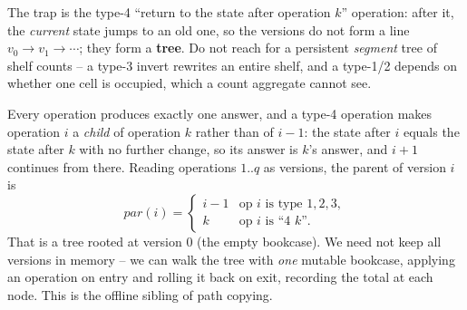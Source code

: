 \begin{attemptgate}
The trap is the type-4 ``return to the state after operation \(k\)'' operation: after it, the \emph{current} state jumps to an old one, so the versions do not form a line \(v_0\!\to\!v_1\!\to\!\cdots\); they form a \textbf{tree}.  Do not reach for a persistent \emph{segment} tree of shelf counts -- a type-3 invert rewrites an entire shelf, and a type-1/2 depends on whether one cell is occupied, which a count aggregate cannot see.
\end{attemptgate}

Every operation produces exactly one answer, and a type-4 operation makes operation \(i\) a \emph{child} of operation \(k\) rather than of \(i-1\): the state after \(i\) equals the state after \(k\) with no further change, so its answer is \(k\)'s answer, and \(i{+}1\) continues from there.  Reading operations \(1..q\) as versions, the parent of version \(i\) is
\[
  \mathit{par}(i) = \begin{cases} i-1 & \text{op } i \text{ is type } 1,2,3,\\ k & \text{op } i \text{ is ``4 } k\text{''}. \end{cases}
\]
That is a tree rooted at version \(0\) (the empty bookcase).  We need not keep all versions in memory -- we can walk the tree with \emph{one} mutable bookcase, applying an operation on entry and rolling it back on exit, recording the total at each node.  This is the offline sibling of path copying.

